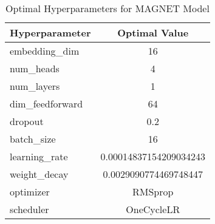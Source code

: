 \begin{table}[h]
\centering
\caption{Optimal Hyperparameters for MAGNET Model}
\label{tab:best_params}
\begin{tabular}{lc}
\toprule
Hyperparameter & Optimal Value \\
\midrule
embedding\_dim & 16 \\
num\_heads & 4 \\
num\_layers & 1 \\
dim\_feedforward & 64 \\
dropout & 0.2 \\
batch\_size & 16 \\
learning\_rate & 0.00014837154209034243 \\
weight\_decay & 0.0029090774469748447 \\
optimizer & RMSprop \\
scheduler & OneCycleLR \\
\bottomrule
\end{tabular}
\end{table}

